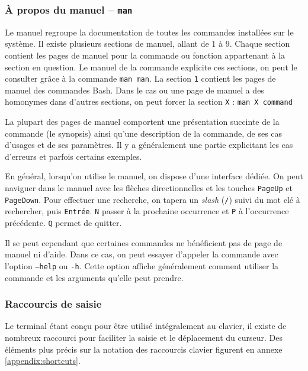 \subsubsection{À propos du manuel -- \texttt{man}} 

Le manuel regroupe la documentation de toutes les commandes installées sur le système. Il existe plusieurs sections de manuel, allant de 1 à 9. Chaque section contient les pages de manuel pour la commande ou fonction appartenant à la section en question. Le manuel de la commande  explicite ces sections, on peut le consulter grâce à la commande \texttt{man man}. La section \texttt{1} contient les pages de manuel des commandes Bash. Dans le cas ou une page de manuel a des homonymes dans d'autres sections, on peut forcer la section \texttt{X} : \texttt{man X command}

La plupart des pages de manuel comportent une présentation succinte de la commande (le synopsis) ainsi qu'une description de la commande, de ses cas d'usages et de ses paramètres. Il y a généralement une partie explicitant les cas d'erreurs et parfois certains exemples.

En général, lorsqu'on utilise le manuel, on dispose d'une interface dédiée. On peut naviguer dans le manuel avec les flèches directionnelles et les touches \texttt{PageUp} et \texttt{PageDown}. Pour effectuer une recherche, on tapera un \textit{slash} (\texttt{/}) suivi du mot clé à rechercher, puis \texttt{Entrée}. \texttt{N} passer à la prochaine occurrence et \texttt{P} à l'occurrence précédente. \texttt{Q} permet de quitter.

Il se peut cependant que certaines commandes ne bénéficient pas de page de manuel ni d'aide. Dans ce cas, on peut essayer d'appeler la commande avec l'option \texttt{--help} ou \texttt{-h}. Cette option affiche généralement comment utiliser la commande et les arguments qu'elle peut prendre.

\newpage

\vspace{-4mm}
\subsubsection{Raccourcis de saisie}
\vspace{-2mm}

Le terminal étant conçu pour être utilisé intégralement au clavier, il existe de nombreux raccourci pour faciliter la saisie et le déplacement du curseur. Des éléments plus précis sur la notation des raccourcis clavier figurent en annexe \ref{appendix:shortcuts}.

